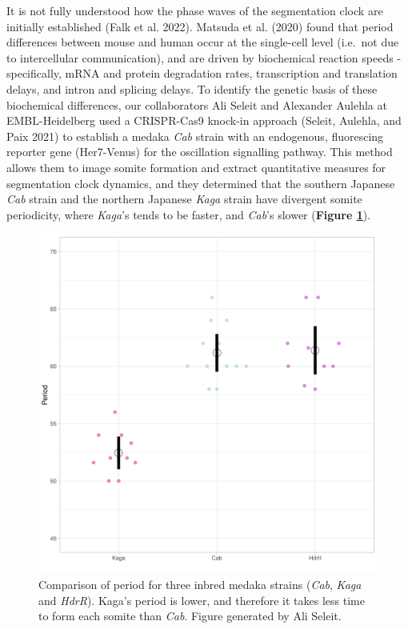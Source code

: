 \documentclass[
]{book}
\begin{document}
It is not fully understood how the phase waves of the segmentation clock are initially established (Falk et al. 2022). Matsuda et al. (2020) found that period differences between mouse and human occur at the single-cell level (i.e.~not due to intercellular communication), and are driven by biochemical reaction speeds - specifically, mRNA and protein degradation rates, transcription and translation delays, and intron and splicing delays. To identify the genetic basis of these biochemical differences, our collaborators Ali Seleit and Alexander Aulehla at EMBL-Heidelberg used a CRISPR-Cas9 knock-in approach (Seleit, Aulehla, and Paix 2021) to establish a medaka \emph{Cab} strain with an endogenous, fluorescing reporter gene (Her7-Venus) for the oscillation signalling pathway. This method allows them to image somite formation and extract quantitative measures for segmentation clock dynamics, and they determined that the southern Japanese \emph{Cab} strain and the northern Japanese \emph{Kaga} strain have divergent somite periodicity, where \emph{Kaga}'s tends to be faster, and \emph{Cab}'s slower (\textbf{Figure \ref{fig:F0-Cab-Kaga-HdrR}}).



\begin{figure}

{\centering \includegraphics[width=0.5\linewidth]{figs/somites/ali_period_F0_Cab_Kaga} 

}

\caption{Comparison of period for three inbred medaka strains (\emph{Cab}, \emph{Kaga} and \emph{HdrR}). Kaga's period is lower, and therefore it takes less time to form each somite than \emph{Cab}. Figure generated by Ali Seleit.}\label{fig:F0-Cab-Kaga-HdrR}
\end{figure}
\end{document}
